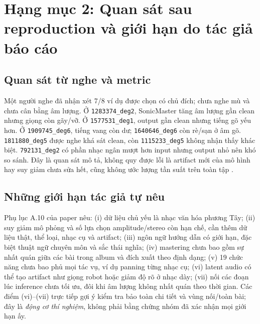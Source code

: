 \documentclass[10pt,a4paper]{article}
\begin{document}
\section{Hạng mục 2: Quan sát sau reproduction và giới hạn do tác giả báo cáo}
\subsection{Quan sát từ nghe và metric}
Một người nghe đã nhận xét 7/8 ví dụ được chọn có chủ đích; chưa nghe mù và chưa cân bằng âm lượng. Ở \texttt{1283374\_deg2}, SonicMaster tăng âm lượng gần clean nhưng giọng còn gãy/vỡ. Ở \texttt{1577531\_deg1}, output gần clean nhưng tiếng gõ yếu hơn. Ở \texttt{1909745\_deg6}, tiếng vang còn dư; \texttt{1640646\_deg6} còn rè/sạn ở âm gõ. \texttt{1811880\_deg5} được nghe khá sát clean, còn \texttt{1115233\_deg5} không nhận thấy khác biệt. \texttt{792131\_deg2} có phần nhạc ngân mượt hơn input nhưng output nhỏ nên khó so sánh. Đây là quan sát mô tả, không quy được lỗi là artifact mới của mô hình hay suy giảm chưa sửa hết, cũng không ước lượng tần suất trên toàn tập \cite{failure}.

\subsection{Những giới hạn tác giả tự nêu}
Phụ lục A.10 của paper \cite{sonicmaster} nêu: (i) dữ liệu chủ yếu là nhạc văn hóa phương Tây; (ii) suy giảm mô phỏng và số lựa chọn amplitude/stereo còn hạn chế, cần thêm dữ liệu thật, thể loại, nhạc cụ và artifact; (iii) ngôn ngữ hướng dẫn có giới hạn, đặc biệt thuật ngữ chuyên môn và sắc thái nghĩa; (iv) mastering chưa bao gồm sự nhất quán giữa các bài trong album và đích xuất theo định dạng; (v) 19 chức năng chưa bao phủ mọi tác vụ, ví dụ panning từng nhạc cụ; (vi) latent audio có thể tạo artifact như giọng robot hoặc giảm độ rõ ở nhạc dày; (vii) nối các đoạn lúc inference chưa tối ưu, đôi khi âm lượng không nhất quán theo thời gian. Các điểm (vi)--(vii) trực tiếp gợi ý kiểm tra bảo toàn chi tiết và vùng nối/toàn bài; đây là \emph{động cơ thí nghiệm}, không phải bằng chứng nhóm đã xác nhận mọi giới hạn ấy.
\end{document}
